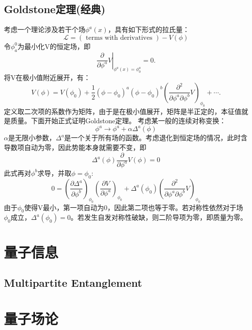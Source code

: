 \documentclass[12pt, a4paper, oneside]{ctexbook}
\begin{document}
	\section{Goldstone定理(经典)}
	考虑一个理论涉及若干个场$ \phi^a(x) $，具有如下形式的拉氏量：
	\begin{equation}
		\mathcal{L}=(\text { terms with derivatives })-V(\phi)
	\end{equation}
	令$ \phi^0_a $为最小化V的恒定场，即
	\begin{equation*}
		\left.\frac{\partial}{\partial \phi^a} V\right|_{\phi^a(x)=\phi_0^a}=0 .
	\end{equation*} 
	将V在极小值附近展开，有：
	\begin{equation*}
		V(\phi)=V\left(\phi_0\right)+\frac{1}{2}\left(\phi-\phi_0\right)^a\left(\phi-\phi_0\right)^b\left(\frac{\partial^2}{\partial \phi^a \partial \phi^b} V\right)_{\phi_0}+\cdots .
	\end{equation*}
	定义取二次项的系数作为矩阵，由于是在极小值展开，矩阵是半正定的，本征值就是质量。下面开始正式证明Goldstone定理。
	考虑某一般的连续对称变换：
	\begin{equation}
		\phi^a \longrightarrow \phi^a+\alpha \Delta^a(\phi)
	\end{equation}
	$ \alpha $是无限小参数，$ \Delta^a $是一个关于所有场的函数。考虑退化到恒定场的情况，此时含导数项自动为零，因此势能本身就需要不变，即
	\begin{equation*}
		\Delta^a(\phi) \frac{\partial}{\partial \phi^a} V(\phi)=0
	\end{equation*} 
	此式再对$ \phi^b $求导，并取$ \phi=\phi_0 $:
	\begin{equation*}
		0=\left(\frac{\partial \Delta^a}{\partial \phi^b}\right)_{\phi_0}\left(\frac{\partial V}{\partial \phi^a}\right)_{\phi_0}+\Delta^a\left(\phi_0\right)\left(\frac{\partial^2}{\partial \phi^a \partial \phi^b} V\right)_{\phi_0}
	\end{equation*}   
	由于$ \phi_0 $使得V最小，第一项自动为0，因此第二项也等于零。若对称性依然对于场$ \phi_0 $成立，$ \Delta^a(\phi_0)=0 $。若发生自发对称性破缺，则二阶导项为零，即质量为零。   
    \chapter{量子信息}
    \section{Multipartite Entanglement}
	\chapter{量子场论}
\end{document}
